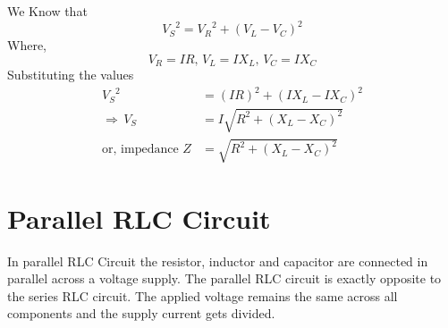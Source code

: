 \documentclass[../main.tex]{subfiles}
\begin{document}
We Know that
\[{V_S}^2={V_R}^2+\left( V_L-V_C \right)^2\]
Where,
\[V_R=IR,\,V_L=IX_L,\,V_C=IX_C\]
Substituting the values
\begin{align*}
    {V_S}^2&=(IR)^2+\left( IX_L-IX_C \right)^2\\
    \Rightarrow\,{V_S}&=I\sqrt{R^2+\left( X_L-X_C \right)^2}\\
    \text{or, impedance }Z&=\sqrt{R^2+\left( X_L-X_C \right)^2}
\end{align*}
\section{Parallel RLC Circuit}
In parallel RLC Circuit the resistor, inductor and capacitor are connected in parallel across a voltage supply. The parallel RLC circuit is exactly opposite to the series RLC circuit. The applied voltage remains the same across all components and the supply current gets divided.
\end{document}
